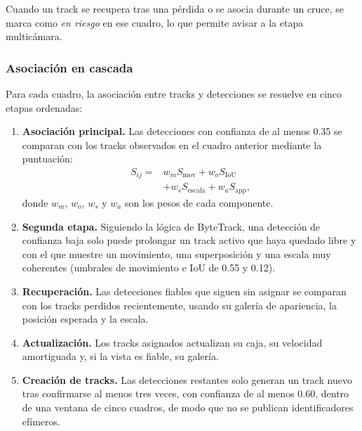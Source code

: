 \documentclass[12pt,letterpaper]{article}
\begin{document}
Cuando un track se recupera tras una pérdida o se asocia durante un
cruce, se marca como \textit{en riesgo} en ese cuadro, lo que permite
avisar a la etapa multicámara.

\subsubsection{Asociación en cascada}

Para cada cuadro, la asociación entre tracks y detecciones se resuelve en
cinco etapas ordenadas:

\begin{enumerate}
    \item \textbf{Asociación principal.} Las detecciones con confianza de
    al menos 0.35 se comparan con los tracks observados en el cuadro
    anterior mediante la puntuación:
    \begin{equation}
    \begin{aligned}
    S_{ij} ={}&
    w_mS_{\text{mov}}
    +w_oS_{\text{IoU}} \\
    &+w_sS_{\text{escala}}
    +w_aS_{\text{app}},
    \end{aligned}
    \end{equation}
    donde $w_m$, $w_o$, $w_s$ y $w_a$ son los pesos de cada componente.

    \item \textbf{Segunda etapa.} Siguiendo la lógica de ByteTrack, una
    detección de confianza baja solo puede prolongar un track activo que
    haya quedado libre y con el que muestre un movimiento, una
    superposición y una escala muy coherentes (umbrales de movimiento e
    IoU de 0.55 y 0.12).

    \item \textbf{Recuperación.} Las detecciones fiables que siguen sin
    asignar se comparan con los tracks perdidos recientemente, usando su
    galería de apariencia, la posición esperada y la escala.

    \item \textbf{Actualización.} Los tracks asignados actualizan su
    caja, su velocidad amortiguada y, si la vista es fiable, su galería.

    \item \textbf{Creación de tracks.} Las detecciones restantes solo
    generan un track nuevo tras confirmarse al menos tres veces, con
    confianza de al menos 0.60, dentro de una ventana de cinco cuadros,
    de modo que no se publican identificadores efímeros.
\end{enumerate}
\end{document}
